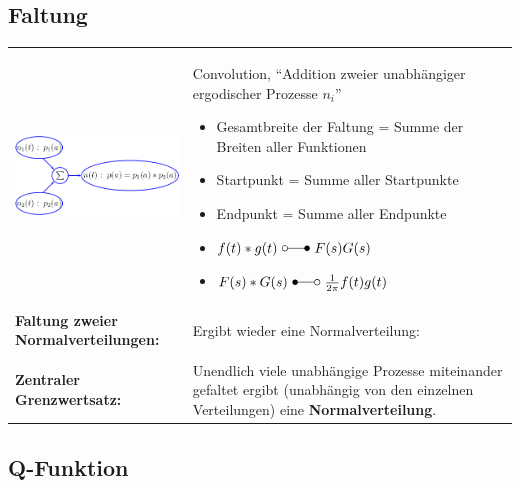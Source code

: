 		
	\newpage
	\subsection{Faltung }
	
		\begin{tabularx}{\textwidth}{lX}
			\parbox{5cm}{
				\includegraphics[width=5cm]{./bilder/faltung.png}
			}
		& 	\parbox{13cm}{
				Convolution, ``Addition zweier unabhängiger ergodischer Prozesse $n_i$'' \\
				 \\
				
			  	\begin{itemize}
			  		\item Gesamtbreite der Faltung = Summe der Breiten aller Funktionen
			  		\item Startpunkt = Summe aller Startpunkte
			  		\item Endpunkt = Summe aller Endpunkte
			  		\item $f(t) * g(t) \ \laplace \ F(s) G(s)$
			  		\item $F(s) * G(s) \ \Laplace \ \frac{1}{2 \pi} f(t) g(t)$
			  	\end{itemize}
			}
		\\
			\textbf{Faltung zweier Normalverteilungen:}
		&
			Ergibt wieder eine Normalverteilung: \newline
		\\ & \\
			\textbf{Zentraler Grenzwertsatz:}
		&	Unendlich viele unabhängige Prozesse miteinander gefaltet ergibt
				(unabhängig von den einzelnen Verteilungen) eine \textbf{Normalverteilung}.
		\end{tabularx}
		
		
	\subsection{Q-Funktion }
	
